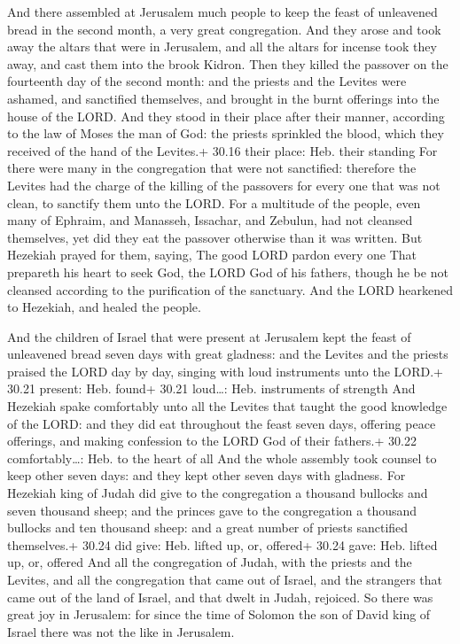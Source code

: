  And there assembled at Jerusalem much people to keep the
feast of unleavened bread in the second month, a very great
congregation.  And they arose and took away the altars that
were in Jerusalem, and all the altars for incense took they away, and
cast them into the brook Kidron.  Then they killed the
passover on the fourteenth day of the second month: and the priests and
the Levites were ashamed, and sanctified themselves, and brought in the
burnt offerings into the house of the LORD.  And they stood
in their place after their manner, according to the law of Moses the man
of God: the priests sprinkled the blood, which they received of the hand
of the Levites.+ 30.16 their place: Heb. their standing 
For there were many in the congregation that were not sanctified:
therefore the Levites had the charge of the killing of the passovers for
every one that was not clean, to sanctify them unto the LORD.
 For a multitude of the people, even many of Ephraim, and
Manasseh, Issachar, and Zebulun, had not cleansed themselves, yet did
they eat the passover otherwise than it was written. But Hezekiah prayed
for them, saying, The good LORD pardon every one  That
prepareth his heart to seek God, the LORD God of his fathers, though he
be not cleansed according to the purification of the sanctuary.
 And the LORD hearkened to Hezekiah, and healed the people.

 And the children of Israel that were present at Jerusalem
kept the feast of unleavened bread seven days with great gladness: and
the Levites and the priests praised the LORD day by day, singing with
loud instruments unto the LORD.+ 30.21 present: Heb. found+ 30.21
loud\ldots: Heb. instruments of strength  And Hezekiah
spake comfortably unto all the Levites that taught the good knowledge of
the LORD: and they did eat throughout the feast seven days, offering
peace offerings, and making confession to the LORD God of their
fathers.+ 30.22 comfortably\ldots: Heb. to the heart of all
 And the whole assembly took counsel to keep other seven
days: and they kept other seven days with gladness.  For
Hezekiah king of Judah did give to the congregation a thousand bullocks
and seven thousand sheep; and the princes gave to the congregation a
thousand bullocks and ten thousand sheep: and a great number of priests
sanctified themselves.+ 30.24 did give: Heb. lifted up, or, offered+
30.24 gave: Heb. lifted up, or, offered  And all the
congregation of Judah, with the priests and the Levites, and all the
congregation that came out of Israel, and the strangers that came out of
the land of Israel, and that dwelt in Judah, rejoiced.  So
there was great joy in Jerusalem: for since the time of Solomon the son
of David king of Israel there was not the like in Jerusalem.

